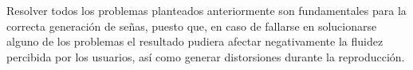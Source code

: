 Resolver todos los problemas planteados anteriormente son fundamentales para la correcta generación de señas, puesto que, en caso de fallarse en solucionarse alguno de los problemas el resultado pudiera afectar negativamente la fluidez percibida por los usuarios, así como generar distorsiones durante la reproducción.
